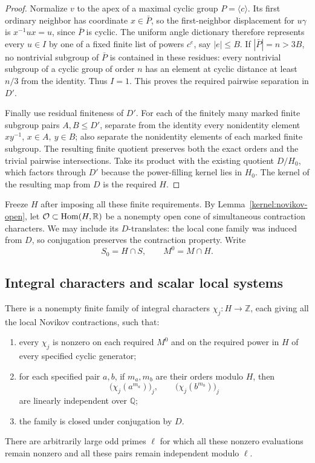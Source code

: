 \begin{proof}
Normalize \(v\) to the apex of a maximal cyclic group
\(P=\langle c\rangle\).  Its first ordinary neighbor has coordinate
\(x\in\bar P\), so the first-neighbor displacement for \(u\gamma\) is
\(x^{-1}ux=u\), since \(\bar P\) is cyclic.  The uniform angle dictionary
therefore represents every \(u\in I\) by one of a fixed finite list of
powers \(c^e\), say \(|e|\le B\).  If \(|\bar P|=n>3B\), no nontrivial
subgroup of \(\bar P\) is contained in these residues: every nontrivial
subgroup of a cyclic group of order \(n\) has an element at cyclic
distance at least \(n/3\) from the identity.  Thus \(I=1\).
This proves the required pairwise separation in \(D'\).

Finally use residual finiteness of \(D'\).  For each of the finitely
many marked finite subgroup pairs \(A,B\le D'\), separate from the
identity every nonidentity element \(xy^{-1}\), \(x\in A,\ y\in B\);
also separate the nonidentity elements of each marked finite subgroup.
The resulting finite quotient preserves both the exact orders and
the trivial pairwise intersections.  Take its product with the
existing quotient \(D/H_0\), which factors through \(D'\) because the
power-filling kernel lies in \(H_0\).  The kernel of the resulting map
from \(D\) is the required \(H\).
\end{proof}

Freeze \(H\) after imposing all these finite requirements.  By
Lemma~\ref{kernel:novikov-open}, let
\(\mathcal O\subset\operatorname{Hom}(H,\mathbb R)\) be a nonempty open cone of
simultaneous contraction characters.  We may include its \(D\)-translates:
the local cone family was induced from \(D\), so conjugation preserves
the contraction property.  Write
\[
                 S_0=H\cap S,\qquad M^0=M\cap H.
\]

\subsection{Integral characters and scalar local systems}

\begin{lemma}\label{kernel:characters}
There is a nonempty finite family of integral characters
\(\chi_j:H\to\mathbb Z\), each giving all the local Novikov
contractions, such that:
\begin{enumerate}[label=\textup{(\roman*)}]
\item every \(\chi_j\) is nonzero on each required \(M^0\) and on the
      required power in \(H\) of every specified cyclic generator;
\item for each specified pair \(a,b\), if \(m_a,m_b\) are their orders
      modulo \(H\), then
\[
       \bigl(\chi_j(a^{m_a})\bigr)_j,\qquad
       \bigl(\chi_j(b^{m_b})\bigr)_j
\]
      are linearly independent over \(\mathbb Q\);
\item the family is closed under conjugation by \(D\).
\end{enumerate}
There are arbitrarily large odd primes \(\ell\) for which all these
nonzero evaluations remain nonzero and all these pairs remain
independent modulo \(\ell\).
\end{lemma}

